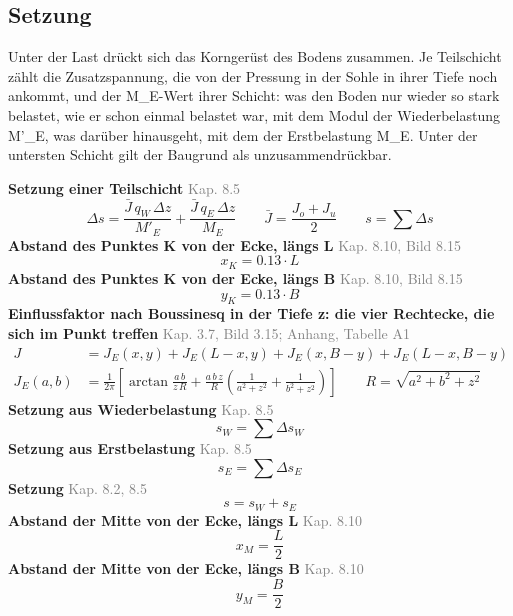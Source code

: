 \documentclass[11pt,a4paper]{article}
\newcommand{\normref}[1]{{\small\textcolor{gray}{#1}}}
\begin{document}
\subsection{Setzung}
Unter der Last drückt sich das Korngerüst des Bodens zusammen. Je Teilschicht zählt die Zusatzspannung, die von der Pressung in der Sohle in ihrer Tiefe noch ankommt, und der M\_E-Wert ihrer Schicht: was den Boden nur wieder so stark belastet, wie er schon einmal belastet war, mit dem Modul der Wiederbelastung M'\_E, was darüber hinausgeht, mit dem der Erstbelastung M\_E. Unter der untersten Schicht gilt der Baugrund als unzusammendrückbar.

\noindent\textbf{Setzung einer Teilschicht} \hfill \normref{Kap. 8.5}
\begin{equation*}
\Delta s = \frac{\bar{J} \, q_W \, \Delta z}{M'_E} + \frac{\bar{J} \, q_E \, \Delta z}{M_E} \qquad \bar{J} = \frac{J_o + J_u}{2} \qquad s = \sum \Delta s
\end{equation*}
\noindent\textbf{Abstand des Punktes K von der Ecke, längs L} \hfill \normref{Kap. 8.10, Bild 8.15}
\begin{equation*}
x_K = 0.13 \cdot L
\end{equation*}
\noindent\textbf{Abstand des Punktes K von der Ecke, längs B} \hfill \normref{Kap. 8.10, Bild 8.15}
\begin{equation*}
y_K = 0.13 \cdot B
\end{equation*}
\noindent\textbf{Einflussfaktor nach Boussinesq in der Tiefe z: die vier Rechtecke, die sich im Punkt treffen} \hfill \normref{Kap. 3.7, Bild 3.15; Anhang, Tabelle A1}
\begin{equation*}
\begin{aligned} J &= J_E(x, y) + J_E(L - x, y) + J_E(x, B - y) + J_E(L - x, B - y) \\ J_E(a, b) &= \frac{1}{2\pi} \left[\arctan\frac{a \, b}{z \, R} + \frac{a \, b \, z}{R} \left(\frac{1}{a^2 + z^2} + \frac{1}{b^2 + z^2}\right)\right] \qquad R = \sqrt{a^2 + b^2 + z^2} \end{aligned}
\end{equation*}
\noindent\textbf{Setzung aus Wiederbelastung} \hfill \normref{Kap. 8.5}
\begin{equation*}
s_W = \sum \Delta s_W
\end{equation*}
\noindent\textbf{Setzung aus Erstbelastung} \hfill \normref{Kap. 8.5}
\begin{equation*}
s_E = \sum \Delta s_E
\end{equation*}
\noindent\textbf{Setzung} \hfill \normref{Kap. 8.2, 8.5}
\begin{equation*}
s = s_W + s_E
\end{equation*}
\noindent\textbf{Abstand der Mitte von der Ecke, längs L} \hfill \normref{Kap. 8.10}
\begin{equation*}
x_M = \frac{L}{2}
\end{equation*}
\noindent\textbf{Abstand der Mitte von der Ecke, längs B} \hfill \normref{Kap. 8.10}
\begin{equation*}
y_M = \frac{B}{2}
\end{equation*}
\end{document}
